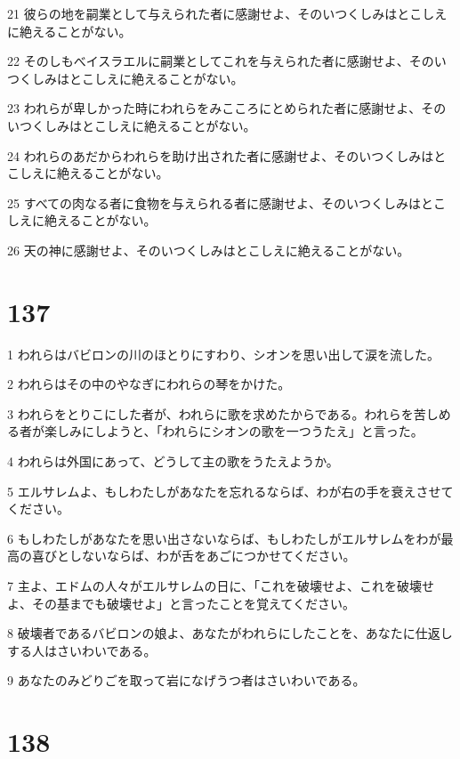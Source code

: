 \par 21 彼らの地を嗣業として与えられた者に感謝せよ、そのいつくしみはとこしえに絶えることがない。
\par 22 そのしもべイスラエルに嗣業としてこれを与えられた者に感謝せよ、そのいつくしみはとこしえに絶えることがない。
\par 23 われらが卑しかった時にわれらをみこころにとめられた者に感謝せよ、そのいつくしみはとこしえに絶えることがない。
\par 24 われらのあだからわれらを助け出された者に感謝せよ、そのいつくしみはとこしえに絶えることがない。
\par 25 すべての肉なる者に食物を与えられる者に感謝せよ、そのいつくしみはとこしえに絶えることがない。
\par 26 天の神に感謝せよ、そのいつくしみはとこしえに絶えることがない。

\chapter{137}

\par 1 われらはバビロンの川のほとりにすわり、シオンを思い出して涙を流した。
\par 2 われらはその中のやなぎにわれらの琴をかけた。
\par 3 われらをとりこにした者が、われらに歌を求めたからである。われらを苦しめる者が楽しみにしようと、「われらにシオンの歌を一つうたえ」と言った。
\par 4 われらは外国にあって、どうして主の歌をうたえようか。
\par 5 エルサレムよ、もしわたしがあなたを忘れるならば、わが右の手を衰えさせてください。
\par 6 もしわたしがあなたを思い出さないならば、もしわたしがエルサレムをわが最高の喜びとしないならば、わが舌をあごにつかせてください。
\par 7 主よ、エドムの人々がエルサレムの日に、「これを破壊せよ、これを破壊せよ、その基までも破壊せよ」と言ったことを覚えてください。
\par 8 破壊者であるバビロンの娘よ、あなたがわれらにしたことを、あなたに仕返しする人はさいわいである。
\par 9 あなたのみどりごを取って岩になげうつ者はさいわいである。

\chapter{138}


